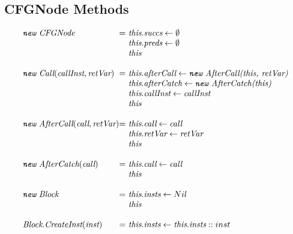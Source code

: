 \subsection{CFGNode Methods}
\[
\begin{array}{l@{}l@{~}l}
\emph{\TT{new}\ CFGNode}
& = & \emph{this}.\emph{succs} \leftarrow \emptyset\\
& & \emph{this}.\emph{preds} \leftarrow \emptyset\\
& & \emph{this}\\
& & \\

\emph{\TT{new}\ Call}(\emph{callInst}, \emph{retVar})
& = & \emph{this}.\emph{afterCall} \leftarrow \emph{\TT{new}\ AfterCall(this, retVar)}\\
& & \emph{this}.\emph{afterCatch} \leftarrow \emph{\TT{new}\ AfterCatch(this)}\\
& & \emph{this}.\emph{callInst} \leftarrow \emph{callInst}\\
& & \emph{this}\\
& & \\

\emph{\TT{new}\ AfterCall}(\emph{call}, \emph{retVar})
& = & \emph{this}.\emph{call} \leftarrow \emph{call}\\
& & \emph{this}.\emph{retVar} \leftarrow \emph{retVar}\\
& & \emph{this}\\
& & \\

\emph{\TT{new}\ AfterCatch}(\emph{call})
& = & \emph{this}.\emph{call} \leftarrow \emph{call}\\
& & \emph{this}\\
& & \\

\emph{\TT{new}\ Block}
& = & \emph{this}.\emph{insts} \leftarrow Nil \\
& & \emph{this}\\
& & \\

\emph{Block}.\emph{CreateInst}(\emph{inst})
& = & \emph{this}.\emph{insts} \leftarrow \emph{this}.\emph{insts} :: inst\\
\end{array}
\]

